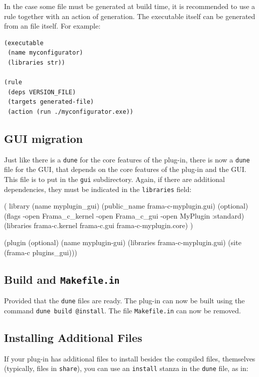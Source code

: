In the case some file must be generated at build time, it is recommended to use
a rule together with an action of generation. The executable itself can be
generated from an \ocaml file itself. For example:

\begin{lstlisting}[language=Dune]
(executable
 (name myconfigurator)
 (libraries str))

(rule
 (deps VERSION_FILE)
 (targets generated-file)
 (action (run ./myconfigurator.exe))
\end{lstlisting}

\subsection{GUI migration}\label{adv:dune-migration:gui}

Just like there is a \texttt{dune} for the core features of the plug-in, there
is now a \texttt{dune} file for the GUI, that depends on the core features of
the plug-in and the \framac GUI. This file is to put in the \texttt{gui}
subdirectory. Again, if there are additional dependencies, they must be
indicated in the \texttt{libraries} field:
\begin{dunecode}
( library
  (name myplugin_gui)
  (public_name frama-c-myplugin.gui)
  (optional)
  (flags -open Frama_c_kernel
         -open Frama_c_gui
         -open MyPlugin :standard)
  (libraries frama-c.kernel frama-c.gui frama-c-myplugin.core)
)

(plugin (optional)
  (name myplugin-gui)
  (libraries frama-c-myplugin.gui)
  (site (frama-c plugins_gui)))
\end{dunecode}

\subsection{Build and \texttt{Makefile.in}}
\lstset{language=shell}
Provided that the \lstinline{dune} files are ready. The plug-in can now be
built using the command \texttt{dune build @install}. The file
\lstinline{Makefile.in} can now be removed.

\subsection{Installing Additional Files}

If your plug-in has additional files to install besides the compiled files,
themselves (typically, files in \texttt{share}), you can use an
\texttt{install} stanza in the \texttt{dune} file, as in:

